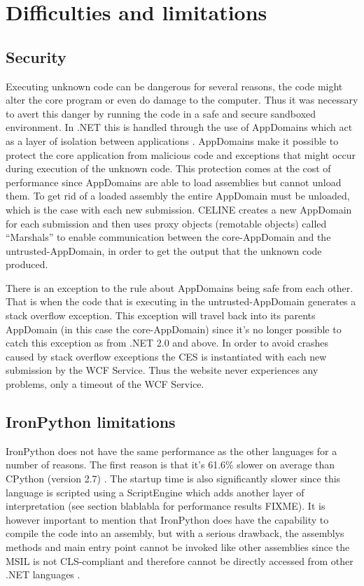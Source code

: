 \section{Difficulties and limitations}

\subsection{Security} \label{subsec:security}
Executing unknown code can be dangerous for several reasons, the code might alter the core program or even do damage to the computer. Thus it was necessary to avert this danger by running the code in a safe and secure sandboxed environment. In .NET this is handled through the use of AppDomains which act as a layer of isolation between applications \cite{ApplicationDomains}. AppDomains make it possible to protect the core application from malicious code and exceptions that might occur during execution of the unknown code. This protection comes at the cost of performance since AppDomains are able to load assemblies but cannot unload them. To get rid of a loaded assembly the entire AppDomain must be unloaded, which is the case with each new submission. CELINE creates a new AppDomain for each submission and then uses proxy objects (remotable objects) called ``Marshals'' \cite{Marshals} to enable communication between the core-AppDomain and the untrusted-AppDomain, in order to get the output that the unknown code produced.

There is an exception to the rule about AppDomains being safe from each other. That is when the code that is executing in the untrusted-AppDomain generates a stack overflow exception. This exception will travel back into its parents AppDomain (in this case the core-AppDomain) since it's no longer possible to catch this exception as from .NET 2.0 and above. In order to avoid crashes caused by stack overflow exceptions the CES is instantiated with each new submission by the WCF Service. Thus the website never experiences any problems, only a timeout of the WCF Service.


\subsection{IronPython limitations} \label{subsec:ironpython_limitations}
IronPython does not have the same performance as the other languages for a number of reasons. The first reason is that it's 61.6\% slower on average than CPython (version 2.7) \cite{IronPythonPerformance}. The startup time is also significantly slower since this language is scripted using a ScriptEngine which adds another layer of interpretation (see section blablabla for performance results FIXME). It is however important to mention that IronPython does have the capability to compile the code into an assembly, but with a serious drawback, the assemblys methods and main entry point cannot be invoked like other assemblies since the MSIL is not CLS-compliant \cite{CLSCompliant} and therefore cannot be directly accessed from other .NET languages \cite{AccessingPythonCode}. 


